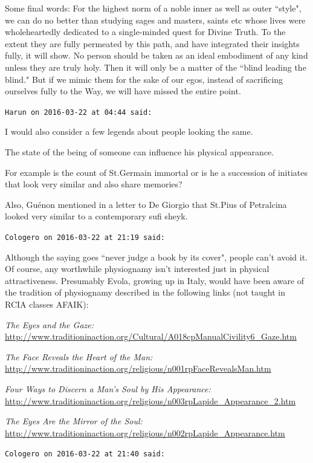 \begin{footnotesize}
\begin{sffamily}
Some final words: For the highest norm of a noble inner as well as outer ``style", we can do no better than studying sages and masters, saints etc whose lives were wholeheartedly dedicated to a single-minded quest for Divine Truth. To the extent they are fully permeated by this path, and have integrated their insights fully, it will show. No person should be taken as an ideal embodiment of any kind unless they are truly holy. Then it will only be a matter of the ``blind leading the blind." But if we mimic them for the sake of our egos, instead of sacrificing ourselves fully to the Way, we will have missed the entire point.


\hfill

\texttt{Harun on 2016-03-22 at 04:44 said: }

I would also consider a few legends about people looking the same.

The state of the being of someone can influence his physical appearance.

For example is the count of St.Germain immortal or is he a succession of initiates that look very similar and also share memories?

Also, Guénon mentioned in a letter to De Giorgio that St.Pius of Petralcina looked very similar to a contemporary sufi sheyk.


\hfill

\texttt{Cologero on 2016-03-22 at 21:19 said: }

Although the saying goes ``never judge a book by its cover", people can't avoid it. Of course, any worthwhile physiognamy isn't interested just in physical attractiveness. Presumably Evola, growing up in Italy, would have been aware of the tradition of physiognamy described in the following links (not taught in RCIA classes AFAIK):

\textit{The Eyes and the Gaze:} \url{http://www.traditioninaction.org/Cultural/A018cpManualCivility6_Gaze.htm}

\textit{The Face Reveals the Heart of the Man:} \url{http://www.traditioninaction.org/religious/n001rpFaceRevealsMan.htm}

\textit{Four Ways to Discern a Man's Soul by His Appearance:} \url{http://www.traditioninaction.org/religious/n003rpLapide_Appearance_2.htm}

\textit{The Eyes Are the Mirror of the Soul: } \url{http://www.traditioninaction.org/religious/n002rpLapide_Appearance.htm}


\hfill

\texttt{Cologero on 2016-03-22 at 21:40 said: }


\end{sffamily}
\end{footnotesize}

